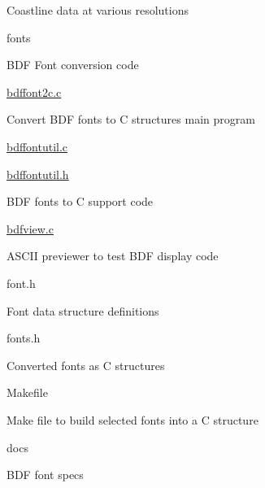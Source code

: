 \begin{DoxyItemize}
\begin{DoxyItemize}
\begin{DoxyItemize}
\begin{DoxyItemize}
\begin{DoxyItemize}
\begin{DoxyItemize}
\item Coastline data at various resolutions
\end{DoxyItemize}
\end{DoxyItemize}
\end{DoxyItemize}
\end{DoxyItemize}
\end{DoxyItemize}
\item fonts
\begin{DoxyItemize}
\item B\-D\-F Font conversion code
\begin{DoxyItemize}
\item \hyperlink{bdffont2c_8c}{bdffont2c.\-c}
\begin{DoxyItemize}
\item Convert B\-D\-F fonts to C structures main program
\end{DoxyItemize}
\item \hyperlink{bdffontutil_8c}{bdffontutil.\-c}
\item \hyperlink{bdffontutil_8h}{bdffontutil.\-h}
\begin{DoxyItemize}
\item B\-D\-F fonts to C support code
\end{DoxyItemize}
\item \hyperlink{bdfview_8c}{bdfview.\-c}
\begin{DoxyItemize}
\item A\-S\-C\-I\-I previewer to test B\-D\-F display code
\end{DoxyItemize}
\item font.\-h
\begin{DoxyItemize}
\item Font data structure definitions
\end{DoxyItemize}
\item fonts.\-h
\begin{DoxyItemize}
\item Converted fonts as C structures
\end{DoxyItemize}
\item Makefile
\begin{DoxyItemize}
\item Make file to build selected fonts into a C structure
\end{DoxyItemize}
\item docs
\begin{DoxyItemize}
\item B\-D\-F font specs

\end{DoxyItemize}
\end{DoxyItemize}
\end{DoxyItemize}
\end{DoxyItemize}
